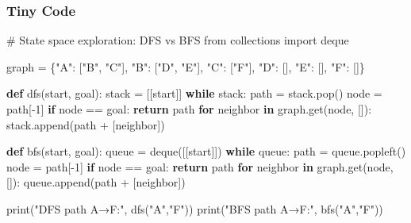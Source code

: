 \documentclass[
  letterpaper,
  DIV=11,
  numbers=noendperiod]{scrreprt}
\newenvironment{Shaded}{\begin{snugshade}}{\end{snugshade}}
\newcommand{\BuiltInTok}[1]{\textcolor[rgb]{0.00,0.23,0.31}{#1}}
\newcommand{\CommentTok}[1]{\textcolor[rgb]{0.37,0.37,0.37}{#1}}
\newcommand{\ControlFlowTok}[1]{\textcolor[rgb]{0.00,0.23,0.31}{\textbf{#1}}}
\newcommand{\DecValTok}[1]{\textcolor[rgb]{0.68,0.00,0.00}{#1}}
\newcommand{\ImportTok}[1]{\textcolor[rgb]{0.00,0.46,0.62}{#1}}
\newcommand{\KeywordTok}[1]{\textcolor[rgb]{0.00,0.23,0.31}{\textbf{#1}}}
\newcommand{\NormalTok}[1]{\textcolor[rgb]{0.00,0.23,0.31}{#1}}
\newcommand{\OperatorTok}[1]{\textcolor[rgb]{0.37,0.37,0.37}{#1}}
\newcommand{\StringTok}[1]{\textcolor[rgb]{0.13,0.47,0.30}{#1}}
\begin{document}
\subsubsection{Tiny Code}\label{tiny-code-61}

\begin{Shaded}
\begin{Highlighting}[]
\CommentTok{\# State space exploration: DFS vs BFS}
\ImportTok{from}\NormalTok{ collections }\ImportTok{import}\NormalTok{ deque}

\NormalTok{graph }\OperatorTok{=}\NormalTok{ \{}\StringTok{"A"}\NormalTok{: [}\StringTok{"B"}\NormalTok{, }\StringTok{"C"}\NormalTok{], }\StringTok{"B"}\NormalTok{: [}\StringTok{"D"}\NormalTok{, }\StringTok{"E"}\NormalTok{], }\StringTok{"C"}\NormalTok{: [}\StringTok{"F"}\NormalTok{], }\StringTok{"D"}\NormalTok{: [], }\StringTok{"E"}\NormalTok{: [], }\StringTok{"F"}\NormalTok{: []\}}

\KeywordTok{def}\NormalTok{ dfs(start, goal):}
\NormalTok{    stack }\OperatorTok{=}\NormalTok{ [[start]]}
    \ControlFlowTok{while}\NormalTok{ stack:}
\NormalTok{        path }\OperatorTok{=}\NormalTok{ stack.pop()}
\NormalTok{        node }\OperatorTok{=}\NormalTok{ path[}\OperatorTok{{-}}\DecValTok{1}\NormalTok{]}
        \ControlFlowTok{if}\NormalTok{ node }\OperatorTok{==}\NormalTok{ goal:}
            \ControlFlowTok{return}\NormalTok{ path}
        \ControlFlowTok{for}\NormalTok{ neighbor }\KeywordTok{in}\NormalTok{ graph.get(node, []):}
\NormalTok{            stack.append(path }\OperatorTok{+}\NormalTok{ [neighbor])}

\KeywordTok{def}\NormalTok{ bfs(start, goal):}
\NormalTok{    queue }\OperatorTok{=}\NormalTok{ deque([[start]])}
    \ControlFlowTok{while}\NormalTok{ queue:}
\NormalTok{        path }\OperatorTok{=}\NormalTok{ queue.popleft()}
\NormalTok{        node }\OperatorTok{=}\NormalTok{ path[}\OperatorTok{{-}}\DecValTok{1}\NormalTok{]}
        \ControlFlowTok{if}\NormalTok{ node }\OperatorTok{==}\NormalTok{ goal:}
            \ControlFlowTok{return}\NormalTok{ path}
        \ControlFlowTok{for}\NormalTok{ neighbor }\KeywordTok{in}\NormalTok{ graph.get(node, []):}
\NormalTok{            queue.append(path }\OperatorTok{+}\NormalTok{ [neighbor])}

\BuiltInTok{print}\NormalTok{(}\StringTok{"DFS path A→F:"}\NormalTok{, dfs(}\StringTok{"A"}\NormalTok{,}\StringTok{"F"}\NormalTok{))}
\BuiltInTok{print}\NormalTok{(}\StringTok{"BFS path A→F:"}\NormalTok{, bfs(}\StringTok{"A"}\NormalTok{,}\StringTok{"F"}\NormalTok{))}
\end{Highlighting}
\end{Shaded}
\end{document}
